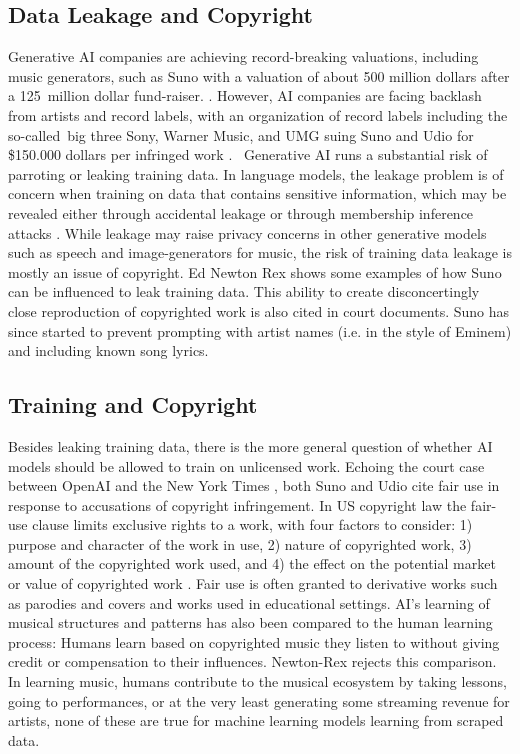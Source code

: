\subsection{Data Leakage and Copyright}
Generative AI companies are achieving record-breaking valuations, including music generators, such as Suno with a valuation of about 500 million dollars after a 125 million dollar fund-raiser. \cite{Stassen_2024} \cite{Tencer_2024}. However, AI companies are facing backlash from artists and record labels, with an organization of record labels including the so-called big three Sony, Warner Music, and UMG suing Suno and Udio for \$150.000 dollars per infringed work \cite{Kaba_River_Perry_2024}.  Generative AI runs a substantial risk of parroting or leaking training data. In language models, the leakage problem is of concern when training on data that contains sensitive information, which may be revealed either through accidental leakage or through membership inference attacks \cite{Duan_Suri_Mireshghallah_Min_Shi_Zettlemoyer_Tsvetkov_Choi_Evans_Hajishirzi_2024}. While leakage may raise privacy concerns in other generative models such as speech and image-generators \cite{Carlini_Hayes_Nasr_Jagielski_Sehwag_Tramèr_Balle_Ippolito_Wallace_2023} for music, the risk of training data leakage is mostly an issue of copyright. Ed Newton Rex shows some examples of how Suno can be influenced \cite{Newton-Rex_2024} to leak training data. This ability to create disconcertingly close reproduction of copyrighted work is also cited in court documents. Suno has since started to prevent prompting with artist names (i.e. in the style of Eminem) and including known song lyrics. 

\subsection{Training and Copyright}
Besides leaking training data, there is the more general question of whether AI models should be allowed to train on unlicensed work. Echoing the court case between OpenAI and the New York Times \cite{Reed_2024}, both Suno and Udio cite fair use in response to accusations of copyright infringement. In US copyright law the fair-use clause limits exclusive rights to a work, with four factors to consider: 1) purpose and character of the work in use, 2) nature of copyrighted work, 3) amount of the copyrighted work used, and 4) the effect on the potential market or value of copyrighted work \cite{copyrightlaw}. Fair use is often granted to derivative works such as parodies and covers and works used in educational settings. AI’s learning of musical structures and patterns has also been compared to the human learning process: Humans learn based on copyrighted music they listen to without giving credit or compensation to their influences. Newton-Rex \cite{Newton-Rex_2024} rejects this comparison. In learning music, humans contribute to the musical ecosystem by taking lessons, going to performances, or at the very least generating some streaming revenue for artists, none of these are true for machine learning models learning from scraped data. 


